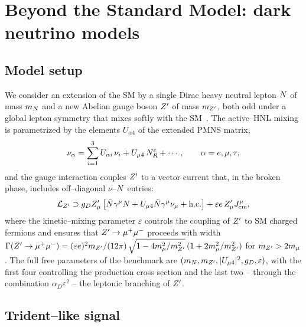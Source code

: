 \section{Beyond the Standard Model: dark neutrino models}\label{sec:bsm-dark-nu}

\subsection{Model setup}

We consider an extension of the SM by a single Dirac heavy neutral
lepton $N$ of mass $m_N$ and a new Abelian gauge boson $Z^{\prime}$ of
mass $m_{Z^{\prime}}$, both odd under a global lepton symmetry that mixes
softly with the SM~\cite{Bertuzzo:2018itn,Ballett:2018ynz,
Ballett:2019pyw,Abdullahi:2020nyr}.  The active--HNL mixing is
parametrized by the elements $U_{\alpha 4}$ of the extended PMNS matrix,
\begin{equation}
  \nu_\alpha = \sum_{i=1}^{3} U_{\alpha i}\,\nu_i + U_{\mu 4}\,N_R^c + \cdots,
  \qquad \alpha = e,\mu,\tau,
\end{equation}
and the gauge interaction couples $Z^{\prime}$ to a vector current that, in
the broken phase, includes off--diagonal $\nu$--$N$ entries:
\begin{equation}
  \mathcal{L}_{Z^{\prime}} \supset
  g_D Z^{\prime}_\mu\,
  \big[\bar{N}\gamma^\mu N
       + U_{\mu 4} \bar{N}\gamma^\mu \nu_\mu + \text{h.c.}\big]
  + \varepsilon e\, Z^{\prime}_\mu J^\mu_{\rm em},
  \label{eq:LZpdark}
\end{equation}
where the kinetic--mixing parameter $\varepsilon$ controls the coupling
of $Z^{\prime}$ to SM charged fermions and ensures that $Z^{\prime} \to \mu^+\mu^-$
proceeds with width
$\Gamma(Z^{\prime} \to \mu^+\mu^-) = (\varepsilon e)^2 m_{Z^{\prime}}/(12\pi)\,
\sqrt{1-4m_\mu^2/m_{Z^{\prime}}^2}\,(1+2m_\mu^2/m_{Z^{\prime}}^2)$ for $m_{Z^{\prime}} > 2m_\mu$.  The
full free parameters of the benchmark are
$(m_N, m_{Z^{\prime}}, |U_{\mu 4}|^2, g_D, \varepsilon)$, with the first four
controlling the production cross section and the last two -- through
the combination $\alpha_D \varepsilon^2$ -- the leptonic branching of
$Z^{\prime}$.

\subsection{Trident--like signal}


